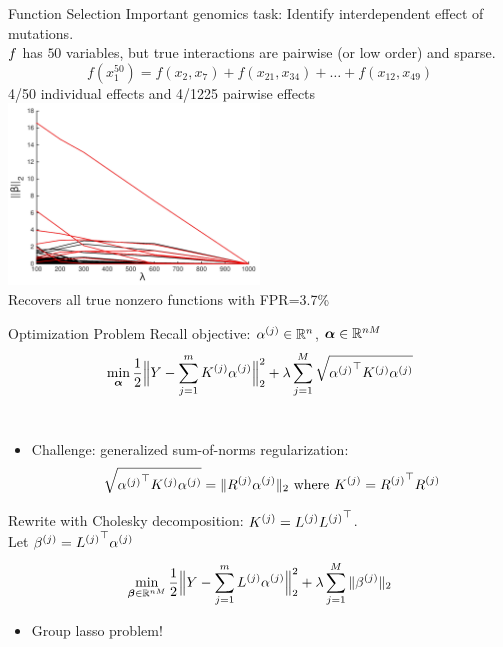 \begin{frame}{Function Selection}
Important genomics task: Identify interdependent effect of mutations. \\
\vspace{0.1in}
$f$ has $50$ variables, but true interactions are pairwise (or
low order) and sparse.
\[
f(x_1^{50}) = f(x_2,x_7) + f(x_{21},x_{34}) + \dots + f(x_{12},x_{49})
\]
4/50 individual effects and 4/1225 pairwise effects \\
\centering
\includegraphics[width=0.5\textwidth]{figs/solnpath600.pdf} \\
Recovers all true nonzero functions with FPR=3.7\%
\end{frame}

\begin{frame}{Optimization Problem}
Recall objective:  ${\alpha^{(j)}} \in \mathbb{R}^n$, ${\bm{\alpha}} \in \mathbb{R}^{nM}$
\begin{equation*}
\min_{\bm{\alpha}} \frac{1}{2}\Big\|Y - \sum_{j=1}^m {K^{(j)}} {\alpha^{(j)}}\Big\|_2^2 + 
  \lambda \sum_{j=1}^M \sqrt{{{\alpha^{(j)}}}^\top {K^{(j)}} {\alpha^{(j)}}}
\end{equation*} \\
\begin{itemize}
\item  Challenge: generalized sum-of-norms regularization:
\begin{equation*}
\sqrt{{{\alpha^{(j)}}}^\top {K^{(j)}} {\alpha^{(j)}}} = \|{R^{(j)}} {\alpha^{(j)}} \|_2 
\text{ where } {K^{(j)}} = {R^{(j)}}^\top {R^{(j)}}
\end{equation*}
\end{itemize}
\pause
Rewrite with Cholesky decomposition: ${K^{(j)}} = {L^{(j)}} {L^{(j)}}^\top$. \\ 
Let ${\beta^{(j)}} = {L^{(j)}}^\top {\alpha^{(j)}}$
\begin{equation*}
\min_{{\bm{\beta}} \in \mathbb{R}^{nM}} 
\frac{1}{2}\Big\|Y - \sum_{j=1}^m {L^{(j)}} {\alpha^{(j)}}\Big\|_2^2 + 
\lambda \sum_{j=1}^M \|{\beta^{(j)}}\|_2
\end{equation*}
\vspace{-0.2in}
\begin{itemize}
\item Group lasso problem!
\end{itemize}
\end{frame}

